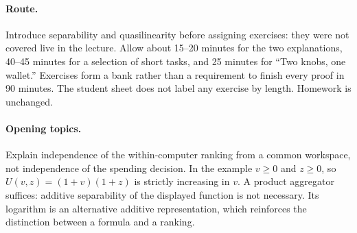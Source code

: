 \documentclass[11pt,a4paper]{article}
\begin{document}
\paragraph{Route.} Introduce separability and quasilinearity before assigning exercises: they were not covered live in the lecture. Allow about 15--20 minutes for the two explanations, 40--45 minutes for a selection of short tasks, and 25 minutes for ``Two knobs, one wallet.'' Exercises form a bank rather than a requirement to finish every proof in 90 minutes. The student sheet does not label any exercise by length. Homework is unchanged.
\paragraph{Opening topics.} Explain independence of the within-computer ranking from a common workspace, not independence of the spending decision. In the example $v\ge0$ and $z\ge0$, so $U(v,z)=(1+v)(1+z)$ is strictly increasing in $v$. A product aggregator suffices: additive separability of the displayed function is not necessary. Its logarithm is an alternative additive representation, which reinforces the distinction between a formula and a ranking.
\end{document}
